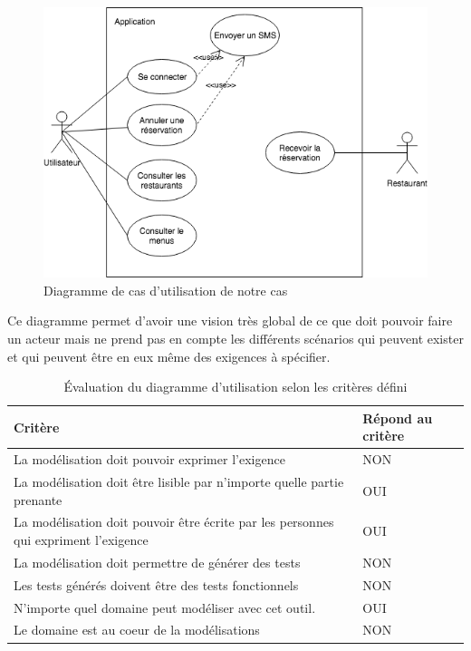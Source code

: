         \begin{figure}[H]
            \centering
            \includegraphics[width=\textwidth]{images/useeCAse.png}
            \caption{Diagramme de cas d'utilisation de notre cas}
        \end{figure}

        Ce diagramme permet d'avoir une vision très global de ce que doit pouvoir faire un acteur mais ne prend pas en compte les différents scénarios qui peuvent exister et qui peuvent être en eux même des exigences à spécifier.

        \begin{table}[H]
        \centering
         \begin{tabular}{|p{25em}|p{5em}|} 
         \hline
        Critère & Répond au critère \\ [0.5ex] 
         \hline
         La modélisation doit pouvoir exprimer l’exigence & \cellcolor[HTML]{D03737}NON\\
         \hline
        La modélisation doit être lisible par n’importe quelle partie prenante & \cellcolor[HTML]{699A73}OUI\\
         \hline
        La modélisation doit pouvoir être écrite par les personnes qui expriment l’exigence &\cellcolor[HTML]{699A73} OUI \\
         \hline
        La modélisation doit permettre de générer des tests & \cellcolor[HTML]{D03737}NON \\
         \hline
        Les tests générés doivent être des tests fonctionnels &\cellcolor[HTML]{D03737} NON\\ 
         \hline
        N’importe quel domaine peut modéliser avec cet outil.&\cellcolor[HTML]{699A73} OUI\\ 
         \hline
        Le domaine est au coeur de la modélisations &\cellcolor[HTML]{D03737} NON\\ 
        \hline 
        \end{tabular}
        \caption{Évaluation du diagramme d'utilisation selon les critères défini}
        \end{table}
    
